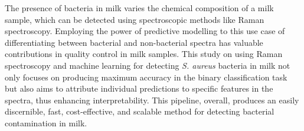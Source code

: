 
The presence of bacteria in milk varies the chemical composition of a milk sample, which can be detected using spectroscopic methods like Raman spectroscopy. Employing the power of predictive modelling to this use case of differentiating between bacterial and non-bacterial spectra has valuable contributions in quality control in milk samples. This study on using Raman spectroscopy and machine learning for detecting \textit{S. aureus} bacteria in milk not only focuses on producing maximum accuracy in the binary classification task but also aims to attribute individual predictions to specific features in the spectra, thus enhancing interpretability. This pipeline, overall, produces an easily discernible, fast, cost-effective, and scalable method for detecting bacterial contamination in milk. 